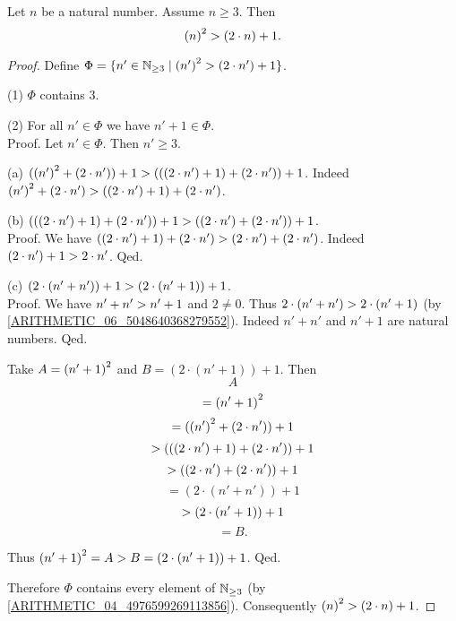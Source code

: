 \documentclass[../arithmetic.tex]{subfiles}
\begin{document}
  \begin{forthel}
    \begin{proposition}
      Let $n$ be a natural number.
      Assume $n \geq 3$.
      Then \[ \left(n\right)^{2} > (2 \cdot n) + 1. \]
    \end{proposition}
    \begin{proof}
      Define $\Phi = \{ n' \in \mathbb{N}_{\geq 3} \mid \left(n'\right)^{2} > (2 \cdot n') + 1 \}$.

      (1) $\Phi$ contains $3$.

      (2) For all $n' \in \Phi$ we have $n' \plus 1 \in \Phi$. \\
      Proof.
        Let $n' \in \Phi$.
        Then $n' \geq 3$.

        (a) $(\left(n'\right)^{2} + (2 \cdot n')) + 1
        > (((2 \cdot n') + 1) + (2 \cdot n')) + 1$.
        Indeed $\left(n'\right)^{2} + (2 \cdot n') > ((2 \cdot n') + 1) + (2 \cdot n')$.

        (b) $(((2 \cdot n') + 1) + (2 \cdot n')) + 1
        > ((2 \cdot n') + (2 \cdot n')) + 1$. \\
        Proof.
          We have $((2 \cdot n') + 1) + (2 \cdot n')
          > (2 \cdot n') + (2 \cdot n')$.
          Indeed $(2 \cdot n') + 1 > 2 \cdot n'$.
        Qed.

        (c) $(2 \cdot (n' + n')) + 1 > (2 \cdot (n' + 1)) + 1$. \\
        Proof.
          We have $n' + n' > n' + 1$ and $2 \neq 0$.
          Thus $2 \cdot (n' + n') > 2 \cdot (n' + 1)$
          (by \cref{ARITHMETIC_06_5048640368279552}).
          Indeed $n' \plus n'$ and $n' \plus 1$ are natural numbers.
        Qed.

        Take $A = \left(n' + 1\right)^{2}$ and $B = (2 \cdot (n' \plus 1)) \plus 1$. %
        Then
        \[  A                                             \]
        \[    = \left(n' + 1\right)^{2}                              \]
        \[    = (\left(n'\right)^{2} + (2 \cdot n')) + 1               \]
        \[    > (((2 \cdot n') + 1) + (2 \cdot n')) + 1   \]  %
        \[    > ((2 \cdot n') + (2 \cdot n')) + 1         \]  %
        \[    = (2 \cdot (n' \plus n')) \plus 1                   \]
        \[    > (2 \cdot (n' + 1)) + 1                    \]  %
        \[    = B.                                        \]

        Thus $\left(n' + 1\right)^{2} = A > B = (2 \cdot (n' + 1)) + 1$.
      Qed.

      Therefore $\Phi$ contains every element of $\mathbb{N}_{\geq 3}$
      (by \cref{ARITHMETIC_04_4976599269113856}).
      Consequently $\left(n\right)^{2} > (2 \cdot n) + 1$.
    \end{proof}
  \end{forthel}
\end{document}
